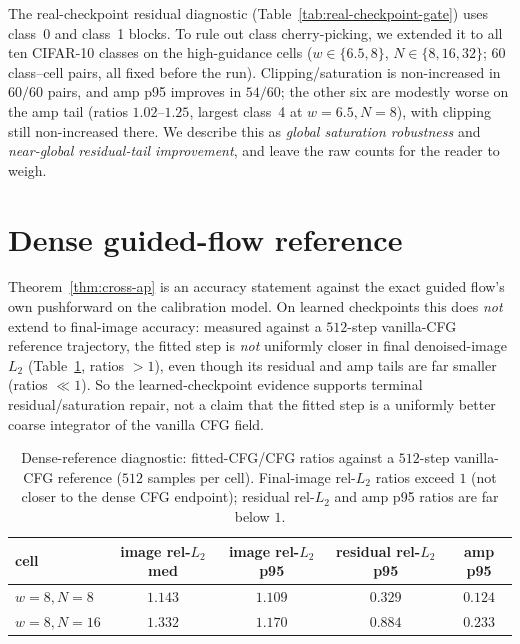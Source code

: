 \documentclass{article} %
\theoremstyle{plain}
\theoremstyle{definition}
\theoremstyle{remark}
\begin{document}
The real-checkpoint residual diagnostic (Table~\ref{tab:real-checkpoint-gate})
uses class~0 and class~1 blocks.  To rule out class cherry-picking, we extended
it to all ten CIFAR-10 classes on the high-guidance cells ($w\in\{6.5,8\}$,
$N\in\{8,16,32\}$; 60 class--cell pairs, all fixed before the run).
Clipping/saturation is non-increased in $60/60$ pairs, and amp p95 improves in
$54/60$; the other six are modestly worse on the amp tail (ratios $1.02$--$1.25$,
largest class~4 at $w{=}6.5,N{=}8$), with clipping still non-increased there.  We
describe this as \emph{global saturation robustness} and \emph{near-global
residual-tail improvement}, and leave the raw counts for the reader to weigh.
\FloatBarrier

\section{Dense guided-flow reference}
\label{app:denseref}

Theorem~\ref{thm:cross-ap} is an accuracy statement against the exact guided
flow's own pushforward on the calibration model.  On learned checkpoints this
does \emph{not} extend to final-image accuracy: measured against a $512$-step
vanilla-CFG reference trajectory, the fitted step is \emph{not} uniformly closer
in final denoised-image $L_2$ (Table~\ref{tab:denseref}, ratios $>1$), even
though its residual and amp tails are far smaller (ratios $\ll1$).  So the
learned-checkpoint evidence supports terminal residual/saturation repair, not a
claim that the fitted step is a uniformly better coarse integrator of the vanilla
CFG field.

\begin{table}[ht]
\centering
\caption{Dense-reference diagnostic: fitted-CFG/CFG ratios against a $512$-step
vanilla-CFG reference ($512$ samples per cell).  Final-image rel-$L_2$ ratios
exceed $1$ (not closer to the dense CFG endpoint); residual rel-$L_2$ and amp p95
ratios are far below $1$.}
\label{tab:denseref}
{\small
\begin{tabular}{lcccc}
\toprule
cell & image rel-$L_2$ med & image rel-$L_2$ p95 & residual rel-$L_2$ p95 & amp p95 \\
\midrule
$w{=}8,N{=}8$  & $1.143$ & $1.109$ & $0.329$ & $0.124$ \\
$w{=}8,N{=}16$ & $1.332$ & $1.170$ & $0.884$ & $0.233$ \\
\bottomrule
\end{tabular}}
\end{table}
\end{document}
